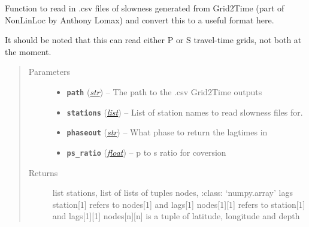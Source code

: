 \documentclass[a4paper,10pt,english]{sphinxmanual}
\begin{document}
\begin{fulllineitems}
\label{modules:bright_lights._read_tt}
Function to read in .csv files of slowness generated from Grid2Time (part
of NonLinLoc by Anthony Lomax) and convert this to a useful format here.

It should be noted that this can read either P or S travel-time grids, not
both at the moment.
\begin{quote}\begin{description}
\item[{Parameters}] \leavevmode\begin{itemize}
\item {} 
\textbf{\texttt{path}} (\href{https://docs.python.org/library/functions.html\#str}{\emph{str}}) -- The path to the .csv Grid2Time outputs

\item {} 
\textbf{\texttt{stations}} (\href{https://docs.python.org/library/functions.html\#list}{\emph{list}}) -- List of station names to read slowness files for.

\item {} 
\textbf{\texttt{phaseout}} (\href{https://docs.python.org/library/functions.html\#str}{\emph{str}}) -- What phase to return the lagtimes in

\item {} 
\textbf{\texttt{ps\_ratio}} (\href{https://docs.python.org/library/functions.html\#float}{\emph{float}}) -- p to s ratio for coversion

\end{itemize}

\item[{Returns}] \leavevmode
list stations, list of lists of tuples nodes,     :class: `numpy.array' lags station{[}1{]} refers to nodes{[}1{]} and     lags{[}1{]} nodes{[}1{]}{[}1{]} refers to station{[}1{]} and lags{[}1{]}{[}1{]}    nodes{[}n{]}{[}n{]} is a tuple of latitude, longitude and depth

\end{description}\end{quote}

\end{fulllineitems}

\end{document}
